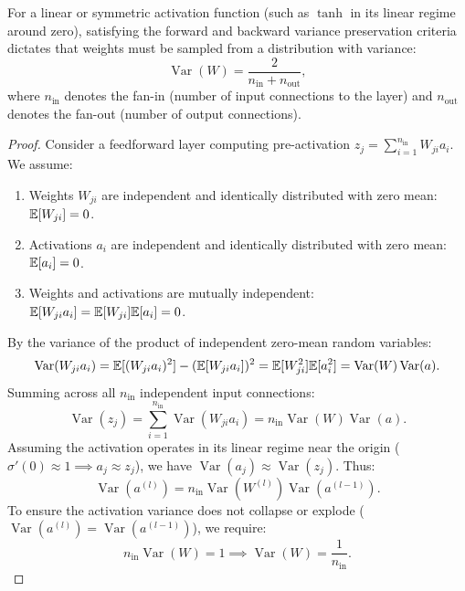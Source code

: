 \begin{theorem}
For a linear or symmetric activation function (such as $\tanh$ in its linear regime around zero), satisfying the forward and backward variance preservation criteria dictates that weights must be sampled from a distribution with variance:
\begin{equation}
\operatorname{Var}(W) = \frac{2}{n_{\text{in}} + n_{\text{out}}},
\label{eq:xavier_variance_formula}
\end{equation}
where $n_{\text{in}}$ denotes the fan-in (number of input connections to the layer) and $n_{\text{out}}$ denotes the fan-out (number of output connections).
\end{theorem}
\begin{proof}
Consider a feedforward layer computing pre-activation $z_j = \sum_{i=1}^{n_{\text{in}}} W_{ji} a_i$. We assume:
\begin{enumerate}[noitemsep,topsep=2pt,parsep=0pt,partopsep=0pt]
  \item Weights $W_{ji}$ are independent and identically distributed with zero mean: $\mathbb{E}[W_{ji}] = 0$.
  \item Activations $a_i$ are independent and identically distributed with zero mean: $\mathbb{E}[a_i] = 0$.
  \item Weights and activations are mutually independent: $\mathbb{E}[W_{ji} a_i] = \mathbb{E}[W_{ji}]\mathbb{E}[a_i] = 0$.
\end{enumerate}

By the variance of the product of independent zero-mean random variables:
\begin{equation}
\operatorname{Var}(W_{ji} a_i) = \mathbb{E}[(W_{ji} a_i)^2] - (\mathbb{E}[W_{ji} a_i])^2 = \mathbb{E}[W_{ji}^2] \mathbb{E}[a_i^2] = \operatorname{Var}(W) \operatorname{Var}(a).
\label{eq:product_variance}
\end{equation}
Summing across all $n_{\text{in}}$ independent input connections:
\begin{equation}
\operatorname{Var}(z_j) = \sum_{i=1}^{n_{\text{in}}} \operatorname{Var}(W_{ji} a_i) = n_{\text{in}} \operatorname{Var}(W) \operatorname{Var}(a).
\label{eq:forward_var_sum}
\end{equation}
Assuming the activation operates in its linear regime near the origin ($\sigma'(0) \approx 1 \implies a_j \approx z_j$), we have $\operatorname{Var}(a_j) \approx \operatorname{Var}(z_j)$. Thus:
\begin{equation}
\operatorname{Var}(a^{(l)}) = n_{\text{in}} \operatorname{Var}(W^{(l)}) \operatorname{Var}(a^{(l-1)}).
\label{eq:forward_variance_recurrence}
\end{equation}
To ensure the activation variance does not collapse or explode ($\operatorname{Var}(a^{(l)}) = \operatorname{Var}(a^{(l-1)})$), we require:
\begin{equation}
n_{\text{in}} \operatorname{Var}(W) = 1 \implies \operatorname{Var}(W) = \frac{1}{n_{\text{in}}}.
\label{eq:fan_in_condition}
\end{equation}


\end{proof}
